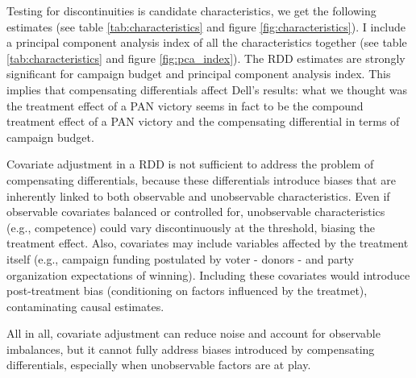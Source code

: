 \documentclass{article}
\begin{document}


Testing for discontinuities is candidate characteristics, we get the following estimates (see table \ref{tab:characteristics} and figure \ref{fig:characteristics}). I include a principal component analysis index of all the characteristics together (see table \ref{tab:characteristics} and figure \ref{fig:pca_index}). The RDD estimates are strongly significant for campaign budget and principal component analysis index. This implies that compensating differentials affect Dell's results: what we thought was the treatment effect of a PAN victory seems in fact to be the compound treatment effect of a PAN victory and the compensating differential in terms of campaign budget.

Covariate adjustment in a RDD is not sufficient to address the problem of compensating differentials, because these differentials introduce biases that are inherently linked to both observable and unobservable characteristics. Even if observable covariates balanced or controlled for, unobservable characteristics (e.g., competence) could vary discontinuously at the threshold, biasing the treatment effect. Also, covariates may include variables affected by the treatment itself (e.g., campaign funding postulated by voter - donors - and party organization expectations of winning). Including these covariates would introduce post-treatment bias (conditioning on factors influenced by the treatmet), contaminating causal estimates.

All in all, covariate adjustment can reduce noise and account for observable imbalances, but it cannot fully address biases introduced by compensating differentials, especially when unobservable factors are at play.


\subsection{}
\end{document}
